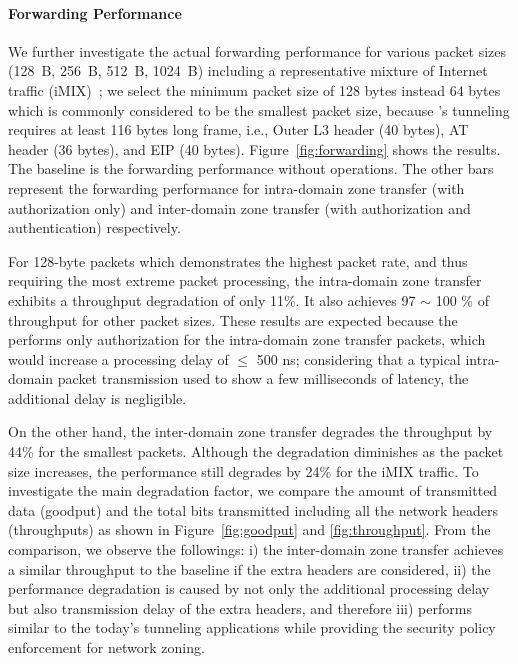\paragraph{Forwarding Performance}
We further investigate the actual forwarding performance for various packet sizes (\SI{128}{B},
\SI{256}{B}, \SI{512}{B}, \SI{1024}{B}) including a representative mixture of Internet traffic 
(iMIX)~\cite{rfc6985}; we select the minimum packet size of 128 bytes instead 64 bytes which is 
commonly considered to be the smallest packet size, because \name's tunneling requires at least 116 
bytes long frame, i.e., Outer L3 header (40 bytes), AT header 
(36 bytes), and EIP (40 bytes). Figure~\ref{fig:forwarding} shows the results. The 
baseline is the forwarding performance without \tp operations. The other bars represent the 
forwarding performance for intra-domain zone transfer (with authorization only) and inter-domain 
zone transfer (with authorization and authentication) respectively.

For 128-byte packets which demonstrates the highest packet rate, and thus requiring the most 
extreme packet processing, the intra-domain zone transfer exhibits a throughput degradation 
of only 11\%. It also achieves 97 $\sim$ 100 \% of throughput for other packet sizes. These
results are expected because the \tp performs only authorization for the intra-domain zone 
transfer packets, which would increase a processing delay of $\leq$ 500 ns; considering that 
a typical intra-domain packet transmission used to show a few milliseconds of latency, the
additional delay is negligible. 

On the other hand, the inter-domain zone transfer degrades the throughput by 44\% for the 
smallest packets. Although the degradation diminishes as the packet size increases, the 
performance still degrades by 24\% for the iMIX traffic. To investigate the main degradation
factor, we compare the amount of transmitted data (goodput) and the total bits transmitted 
including all the network headers (throughputs) as shown in Figure~\ref{fig:goodput} and 
\ref{fig:throughput}. From the comparison, we observe the followings: i) the inter-domain 
zone transfer achieves a similar throughput to the baseline if the extra headers are considered, 
ii) the performance degradation is caused by not only the additional processing delay but also 
transmission delay of the extra headers, and therefore iii) \name performs similar to the 
today's tunneling applications while providing the security policy enforcement for network
zoning.








